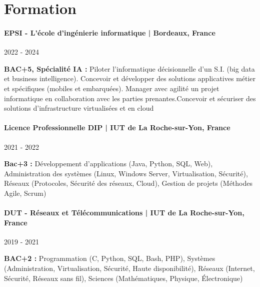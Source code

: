 \documentclass{article}
\begin{document}
\vspace{2ex}
\hrulefill
\section*{Formation}
\paragraph{EPSI - L'école d'ingénierie informatique | Bordeaux, France }\hspace*{\fill}2022 - 2024
\vspace{\baselineskip}

\textbf{BAC+5, Spécialité IA :} Piloter l’informatique décisionnelle d’un S.I. (big data et business intelligence). Concevoir et développer des solutions applicatives métier et spécifiques (mobiles et embarquées). Manager avec agilité un projet informatique en collaboration avec les parties prenantes.Concevoir et sécuriser des solutions d’infrastructure virtualisées et en cloud


\paragraph{Licence Professionnelle DIP | IUT de La Roche-sur-Yon, France }\hspace*{\fill}2021 - 2022
\vspace{\baselineskip}

\textbf{Bac+3 :} Développement d'applications (Java, Python, SQL, Web), Administration des systèmes (Linux, Windows Server, Virtualisation, Sécurité), Réseaux (Protocoles, Sécurité des réseaux, Cloud), Gestion de projets (Méthodes Agile, Scrum)

\paragraph{DUT - Réseaux et Télécommunications | IUT de La Roche-sur-Yon, France }\hspace*{\fill}2019 - 2021
\vspace{\baselineskip}

\textbf{BAC+2 :} Programmation (C, Python, SQL, Bash, PHP), Systèmes (Administration, Virtualisation, Sécurité, Haute disponibilité), Réseaux (Internet, Sécurité, Réseaux sans fil), Sciences (Mathématiques, Physique, Électronique)
\end{document}
